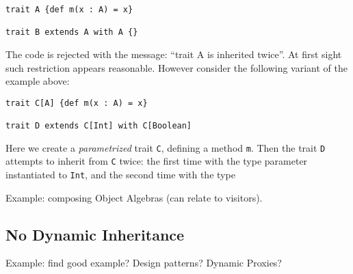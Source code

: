 \begin{lstlisting}
trait A {def m(x : A) = x}

trait B extends A with A {}
\end{lstlisting}

\noindent The code is rejected with the message: ``trait A is
inherited twice''. At first sight such restriction appears
reasonable. However consider the following variant of the example 
above:

\begin{lstlisting}
trait C[A] {def m(x : A) = x}
	
trait D extends C[Int] with C[Boolean]
\end{lstlisting}

\noindent Here we create a \emph{parametrized} trait \lstinline{C}, 
defining a method \lstinline{m}. Then the trait \lstinline{D} attempts 
to inherit from \lstinline{C} twice: the first time with the type
parameter instantiated to \lstinline{Int}, and the second time with
the type 


Example: composing Object Algebras (can relate to visitors).


\subsection{No Dynamic Inheritance}

Example: find good example? Design patterns? Dynamic Proxies?


